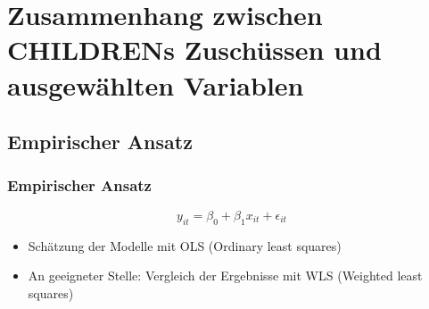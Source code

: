 


%
%

%


% 
% 
\section[Zusammenhang Zuschüsse \& ausgewählte Variablen]{Zusammenhang zwischen CHILDRENs Zuschüssen und ausgewählten Variablen}

% 
\subsection{Empirischer Ansatz}

\begin{frame}
\frametitle{Empirischer Ansatz}

\begin{equation}
\label{SimpleLinearModel}
  y_{it} = \beta_0 + \beta_1 x_{it} + \epsilon_{it}
\end{equation}

\begin{itemize}
\item Schätzung der Modelle mit OLS (Ordinary least squares)
\item An geeigneter Stelle: Vergleich der Ergebnisse mit WLS (Weighted least squares)
\end{itemize}

\end{frame}

